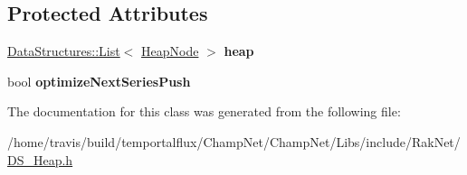 \subsection*{Protected Attributes}
\begin{DoxyCompactItemize}
\item 
\hypertarget{class_data_structures_1_1_heap_ad8407ff11d87c8ebf97481e5c45e9859}{\hyperlink{class_data_structures_1_1_list}{Data\-Structures\-::\-List}$<$ \hyperlink{struct_data_structures_1_1_heap_1_1_heap_node}{Heap\-Node} $>$ {\bfseries heap}}\label{class_data_structures_1_1_heap_ad8407ff11d87c8ebf97481e5c45e9859}

\item 
\hypertarget{class_data_structures_1_1_heap_af9136bef0034e8227c8ad3a22b0443d7}{bool {\bfseries optimize\-Next\-Series\-Push}}\label{class_data_structures_1_1_heap_af9136bef0034e8227c8ad3a22b0443d7}

\end{DoxyCompactItemize}


The documentation for this class was generated from the following file\-:\begin{DoxyCompactItemize}
\item 
/home/travis/build/temportalflux/\-Champ\-Net/\-Champ\-Net/\-Libs/include/\-Rak\-Net/\hyperlink{_d_s___heap_8h}{D\-S\-\_\-\-Heap.\-h}\end{DoxyCompactItemize}
